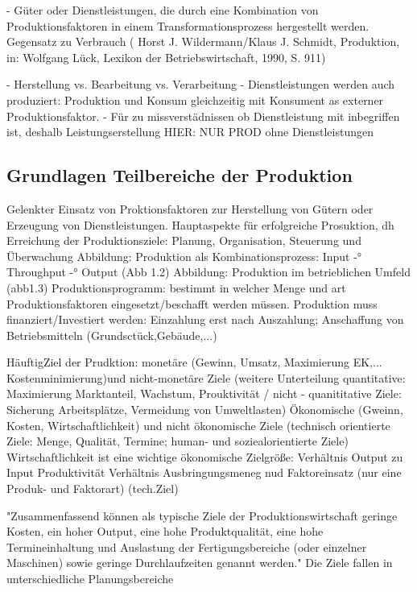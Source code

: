 \documentclass[a4paper,12pt, german]{report}
\begin{document}
- Güter oder Dienstleistungen, die durch eine Kombination von Produktionsfaktoren in einem Transformationsprozess hergestellt werden. Gegensatz zu Verbrauch ( Horst J. Wildermann/Klaus J. Schmidt, Produktion, in: Wolfgang Lück, Lexikon der Betriebswirtschaft, 1990, S. 911)

- Herstellung vs. Bearbeitung vs. Verarbeitung
- Dienstleistungen werden auch produziert: Produktion und Konsum gleichzeitig mit Konsument as externer Produktionsfaktor. 
- Für zu missverstädnissen ob Dienstleistung mit inbegriffen ist, deshalb Leistungserstellung
HIER: NUR PROD ohne Dienstleistungen






\subsection{Grundlagen Teilbereiche der Produktion}

Gelenkter Einsatz von Proktionsfaktoren zur Herstellung von Gütern oder Erzeugung von Dienstleistungen. Hauptaspekte für erfolgreiche Prosuktion, dh Erreichung der Produktionsziele: Planung, Organisation, Steuerung und Überwachung 
Abbildung: Produktion als Kombinationsprozess: Input -° Throughput -° Output (Abb 1.2)
Abbildung: Produktion im betrieblichen Umfeld (abb1.3)
Produktionsprogramm: bestimmt in welcher Menge und art Produktionsfaktoren eingesetzt/beschafft werden müssen.
Produktion muss finanziert/Investiert werden: Einzahlung erst nach Auszahlung; Anschaffung von Betriebsmitteln (Grundsctück,Gebäude,...)
\cite{07}

HäuftigZiel der Prudktion: monetäre (Gewinn, Umsatz, Maximierung EK,... Kostenminimierung)und nicht-monetäre Ziele (weitere Unterteilung quantitative: Maximierung Marktanteil, Wachstum, Prouktivität / nicht - quanititative Ziele: Sicherung Arbeitsplätze, Vermeidung von Umweltlasten) 
Ökonomische (Gweinn, Kosten, Wirtschaftlichkeit) und nicht ökonomische Ziele (technisch orientierte Ziele: Menge, Qualität, Termine; human- und soziealorientierte Ziele)
Wirtschaftlichkeit ist eine wichtige ökonomische Zielgröße: Verhältnis Output zu Input
Produktivität Verhältnis Ausbringungsmeneg nud Faktoreinsatz (nur eine Produk- und Faktorart) (tech.Ziel)

"Zusammenfassend können als typische Ziele der Produktionswirtschaft geringe Kosten,
ein hoher Output, eine hohe Produktqualität, eine hohe Termineinhaltung und Auslastung
der Fertigungsbereiche (oder einzelner Maschinen) sowie geringe Durchlaufzeiten
genannt werden." Die Ziele fallen in unterschiedliche Planungsbereiche
\end{document}

